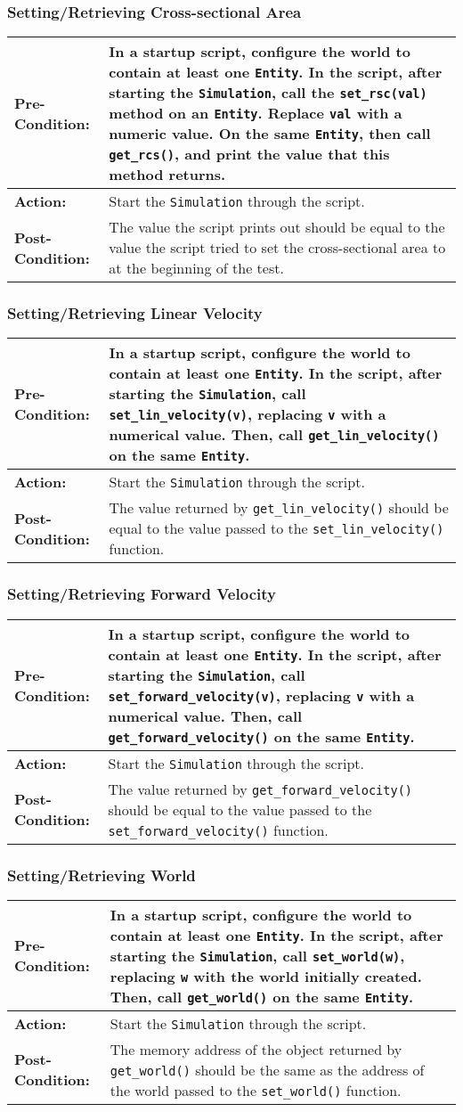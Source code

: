 \documentclass[titlepage]{article}
\newcommand{\testcase}[3]{
    \begin{center}
    \begin{tabular}{| l | p{0.7\textwidth}|}
        \hline
        \rowcolor[gray]{0.8}\textbf{Pre-Condition:} & #1 \\ \hline
        \textbf{Action:} & #2 \\ \hline
        \rowcolor[gray]{0.8}\textbf{Post-Condition:} & #3 \\ \hline
    \end{tabular}
    \end{center}
}
\begin{document}
\subsubsection{Setting/Retrieving Cross-sectional Area}
\testcase{In a startup script, configure the world to contain at least one \texttt{Entity}. In the script, after starting the \texttt{Simulation}, call the \texttt{set\_rsc(val)} method on an \texttt{Entity}. Replace \texttt{val} with a numeric value. On the same \texttt{Entity}, then call \texttt{get\_rcs()}, and print the value that this method returns.}{Start the \texttt{Simulation} through the script.}{The value the script prints out should be equal to the value the script tried to set the cross-sectional area to at the beginning of the test.}

\subsubsection{Setting/Retrieving Linear Velocity}
\testcase{In a startup script, configure the world to contain at least one \texttt{Entity}. In the script, after starting the \texttt{Simulation}, call \texttt{set\_lin\_velocity(v)}, replacing \texttt{v} with a numerical value. Then, call \texttt{get\_lin\_velocity()} on the same \texttt{Entity}.}{Start the \texttt{Simulation} through the script.}{The value returned by \texttt{get\_lin\_velocity()} should be equal to the value passed to the \texttt{set\_lin\_velocity()} function.}

\subsubsection{Setting/Retrieving Forward Velocity}
\testcase{In a startup script, configure the world to contain at least one \texttt{Entity}. In the script, after starting the \texttt{Simulation}, call \texttt{set\_forward\_velocity(v)}, replacing \texttt{v} with a numerical value. Then, call \texttt{get\_forward\_velocity()} on the same \texttt{Entity}.}{Start the \texttt{Simulation} through the script.}{The value returned by \texttt{get\_forward\_velocity()} should be equal to the value passed to the \texttt{set\_forward\_velocity()} function.}

\subsubsection{Setting/Retrieving World}
\testcase{In a startup script, configure the world to contain at least one \texttt{Entity}. In the script, after starting the \texttt{Simulation}, call \texttt{set\_world(w)}, replacing \texttt{w} with the world initially created. Then, call \texttt{get\_world()} on the same \texttt{Entity}.}{Start the \texttt{Simulation} through the script.}{The memory address of the object returned by \texttt{get\_world()} should be the same as the address of the world passed to the \texttt{set\_world()} function.}
\end{document}
